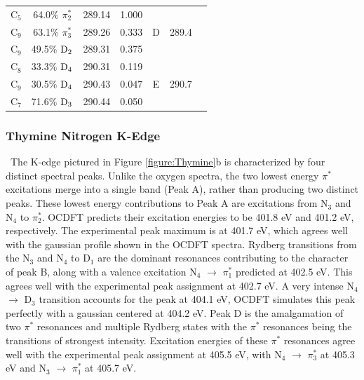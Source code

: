 \documentclass[8.5pt,twoside,twocolumn]{article}
\begin{document}
\begin{table}[!t]
\begin{tabular*}{8.5cm}{@{\extracolsep{\fill} }cccrccc}
    C$_5$
 &   64.0$\%$ $\pi_2^*$  & 289.14 & 1.000 & \multirow{3}{*}{D} & \multirow{3}{*}{289.4} \\
    C$_9$
 &   63.1$\%$ $\pi_3^*$  & 289.26 & 0.333 \\
    C$_9$
 &   49.5$\%$ $\rm D_2$  & 289.31 & 0.375 
 \vspace{0.05in}\\
    C$_8$
 &   33.3$\%$ $\rm D_4$  & 290.31 & 0.119 & \multirow{3}{*}{E} &  \multirow{3}{*}{290.7}  \\
    C$_9$
 &   30.5$\%$ $\rm D_4$  & 290.43 & 0.047 \\
    C$_7$
 &   71.6$\%$ $\rm D_3$  & 290.44 & 0.050 \\
\hline\hline%
   \end{tabular*}
   \label{table: thymine_k_oxygen}
   \end{table}
\subsubsection{Thymine Nitrogen K-Edge} \ The K-edge pictured in Figure \ref{figure:Thymine}b is characterized by four distinct spectral peaks. Unlike the oxygen spectra, the two lowest energy $\pi^*$ excitations merge into a single band (Peak A), rather than producing two distinct peaks. These lowest energy contributions to Peak A are excitations from N$_3$ and N$_4$ to $\pi^*_2$. OCDFT predicts their excitation energies to be 401.8 eV and 401.2 eV, respectively. The experimental peak maximum is at 401.7 eV, which agrees well with the gaussian profile shown in the OCDFT spectra. Rydberg transitions from the N$_3$ and N$_4$ to D$_1$ are the dominant resonances contributing to the character of peak B, along with a valence excitation N$_4$ $\rightarrow$ $\pi^*_1$ predicted at 402.5 eV. This agrees well with the experimental peak assignment at 402.7 eV. A very intense N$_4$ $\rightarrow$ D$_3$ transition accounts for the peak at 404.1 eV, OCDFT simulates this peak perfectly with a gaussian centered at 404.2 eV. Peak D is the amalgamation of two $\pi^*$ resonances and multiple Rydberg states with the $\pi^*$ resonances being the transitions of strongest intensity. Excitation energies of these $\pi^*$ resonances agree well with the experimental peak assignment at 405.5 eV, with N$_4$ $\rightarrow$ $\pi^*_3$ at 405.3 eV and N$_3$ $\rightarrow$ $\pi^*_1$ at 405.7 eV.
\end{document}
